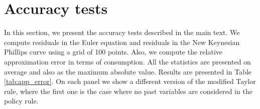\documentclass[11pt]{article}
\numberwithin{equation}{section}
\begin{document}
\section{Accuracy tests}\label{app:accuracy}
	
In this section, we present the accuracy tests described in the main text. We compute residuals in the Euler equation and residuals in the New Keynesian Phillips curve using a grid of 100 points. Also, we compute the relative approximation error in terms of consumption. All the statistics are presented on average and also as the maximum absolute value. Results are presented in Table \ref{tab:app_error}. On each panel we show a different version of the modified Taylor rule, where the first one is the case where no past variables are considered in the policy rule.


	
\end{document}
